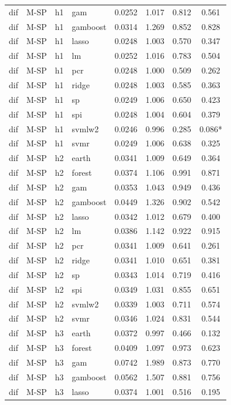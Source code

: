 \begin{ThreePartTable}
\begin{longtable}[t]{llclcccc}
dif & M-SP & h1 & gam & 0.0252 & 1.017 & 0.812 & 0.561\\
dif & M-SP & h1 & gamboost & 0.0314 & 1.269 & 0.852 & 0.828\\
dif & M-SP & h1 & lasso & 0.0248 & 1.003 & 0.570 & 0.347\\
dif & M-SP & h1 & lm & 0.0252 & 1.016 & 0.783 & 0.504\\
dif & M-SP & h1 & pcr & 0.0248 & 1.000 & 0.509 & 0.262\\
dif & M-SP & h1 & ridge & 0.0248 & 1.003 & 0.585 & 0.363\\
dif & M-SP & h1 & sp & 0.0249 & 1.006 & 0.650 & 0.423\\
dif & M-SP & h1 & spi & 0.0248 & 1.004 & 0.604 & 0.379\\
dif & M-SP & h1 & svmlw2 & 0.0246 & 0.996 & 0.285 & 0.086*\\
dif & M-SP & h1 & svmr & 0.0249 & 1.006 & 0.638 & 0.325\\
\addlinespace
dif & M-SP & h2 & earth & 0.0341 & 1.009 & 0.649 & 0.364\\
dif & M-SP & h2 & forest & 0.0374 & 1.106 & 0.991 & 0.871\\
dif & M-SP & h2 & gam & 0.0353 & 1.043 & 0.949 & 0.436\\
dif & M-SP & h2 & gamboost & 0.0449 & 1.326 & 0.902 & 0.542\\
dif & M-SP & h2 & lasso & 0.0342 & 1.012 & 0.679 & 0.400\\
dif & M-SP & h2 & lm & 0.0386 & 1.142 & 0.922 & 0.915\\
dif & M-SP & h2 & pcr & 0.0341 & 1.009 & 0.641 & 0.261\\
dif & M-SP & h2 & ridge & 0.0341 & 1.010 & 0.651 & 0.381\\
dif & M-SP & h2 & sp & 0.0343 & 1.014 & 0.719 & 0.416\\
dif & M-SP & h2 & spi & 0.0349 & 1.031 & 0.855 & 0.651\\
dif & M-SP & h2 & svmlw2 & 0.0339 & 1.003 & 0.711 & 0.574\\
dif & M-SP & h2 & svmr & 0.0346 & 1.024 & 0.831 & 0.544\\
\addlinespace
dif & M-SP & h3 & earth & 0.0372 & 0.997 & 0.466 & 0.132\\
dif & M-SP & h3 & forest & 0.0409 & 1.097 & 0.973 & 0.623\\
dif & M-SP & h3 & gam & 0.0742 & 1.989 & 0.873 & 0.770\\
dif & M-SP & h3 & gamboost & 0.0562 & 1.507 & 0.881 & 0.756\\
dif & M-SP & h3 & lasso & 0.0374 & 1.001 & 0.516 & 0.195\\

\end{longtable}
\end{ThreePartTable}
